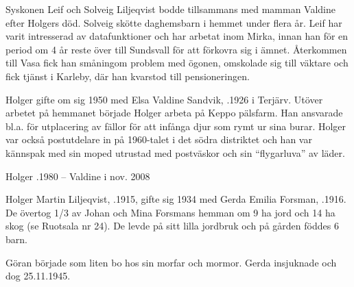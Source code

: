 Syskonen Leif och Solveig Liljeqvist bodde tillsammans med mamman  Valdine efter Holgers död. Solveig skötte daghemsbarn i hemmet under flera år. Leif har varit intresserad av datafunktioner och har arbetat inom Mirka, innan han för en period om 4 år reste över till Sundsvall för att förkovra sig i ämnet. Återkommen till Vasa fick han småningom problem med ögonen, omskolade sig till väktare och fick tjänst i Karleby, där han kvarstod till pensioneringen.


Holger gifte om sig 1950 med Elsa Valdine Sandvik, .1926 i Terjärv. Utöver arbetet på hemmanet började Holger arbeta på Keppo pälsfarm. Han ansvarade bl.a. för utplacering av fällor för att infånga djur som rymt ur sina burar. Holger var också postutdelare in på 1960-talet i det södra distriktet och han var kännspak med sin moped utrustad med postväskor och sin ``flygarluva'' av läder.
\begin{jhchildren}
  \item {}
  \item {}
  \item {}
  \item {}
  \item {}
  \item {}
\end{jhchildren}
Holger .1980  --  Valdine \textdied i nov. 2008


Holger Martin Liljeqvist, .1915, gifte sig 1934 med Gerda Emilia Forsman, .1916. De övertog 1/3 av Johan och Mina Forsmans hemman om 9 ha jord och 14 ha skog (se Ruotsala nr 24). De levde på sitt lilla jordbruk och på gården föddes 6 barn.
\begin{jhchildren}
  \item {}
  \item {}
  \item {}
  \item {}
  \item {}
  \item {}
\end{jhchildren}
Göran började som liten bo hos sin morfar och mormor. Gerda insjuknade och dog 25.11.1945.



